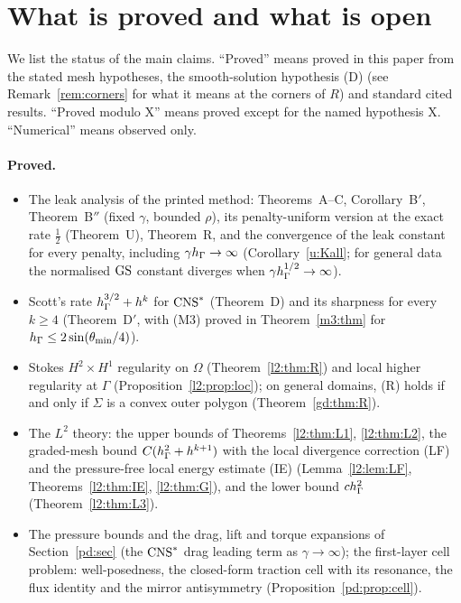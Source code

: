 \section{What is proved and what is open}\label{sec:open}

We list the status of the main claims. ``Proved'' means proved in this paper from the stated mesh hypotheses, the smooth-solution hypothesis (D) (see Remark~\ref{rem:corners} for what it means at the corners of $R$) and standard cited results. ``Proved modulo X'' means proved except for the named hypothesis X. ``Numerical'' means observed only.

\paragraph{Proved.}
\begin{itemize}
\item The leak analysis of the printed method: Theorems~A--C, Corollary~B$'$, Theorem~B$''$ (fixed $\gamma$, bounded $\rho$), its penalty-uniform version at the exact rate $\frac12$ (Theorem~U), Theorem~R, and the convergence of the leak constant for every penalty, including $\gamma h_\Gamma\to\infty$ (Corollary~\ref{u:Kall}; for general data the normalised $\mathrm{GS}$ constant diverges when $\gamma h_\Gamma^{1/2}\to\infty$).
\item Scott's rate $h_\Gamma^{3/2}+h^k$ for $\mathrm{CNS}^\ast$ (Theorem~D) and its sharpness for every $k\ge4$ (Theorem~D$'$, with (M3) proved in Theorem~\ref{m3:thm} for $h_\Gamma\le2\sin(\theta_{\min}/4)$).
\item Stokes $H^2\times H^1$ regularity on $\Omega$ (Theorem~\ref{l2:thm:R}) and local higher regularity at $\Gamma$ (Proposition~\ref{l2:prop:loc}); on general domains, (R) holds if and only if $\Sigma$ is a convex outer polygon (Theorem~\ref{gd:thm:R}).
\item The $L^2$ theory: the upper bounds of Theorems~\ref{l2:thm:L1}, \ref{l2:thm:L2}, the graded-mesh bound $C(h_\Gamma^2+h^{k+1})$ with the local divergence correction (LF) and the pressure-free local energy estimate (IE) (Lemma~\ref{l2:lem:LF}, Theorems~\ref{l2:thm:IE}, \ref{l2:thm:G}), and the lower bound $ch_\Gamma^2$ (Theorem~\ref{l2:thm:L3}).
\item The pressure bounds and the drag, lift and torque expansions of Section~\ref{pd:sec} (the $\mathrm{CNS}^\ast$ drag leading term as $\gamma\to\infty$); the first-layer cell problem: well-posedness, the closed-form traction cell with its resonance, the flux identity and the mirror antisymmetry (Proposition~\ref{pd:prop:cell}).

\end{itemize}
